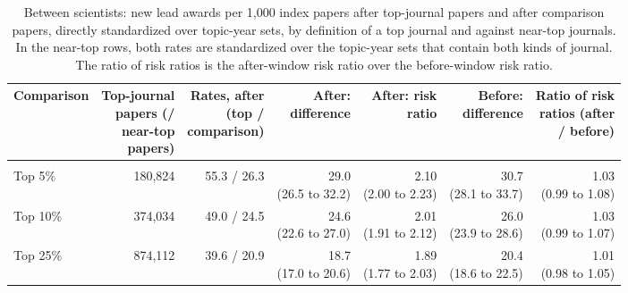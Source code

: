 \begin{table}[H]
\centering\small
\caption{Between scientists: new lead awards per 1,000 index papers after top-journal papers and after comparison papers, directly standardized over topic-year sets, by definition of a top journal and against near-top journals. In the near-top rows, both rates are standardized over the topic-year sets that contain both kinds of journal. The ratio of risk ratios is the after-window risk ratio over the before-window risk ratio.}\label{tab:s_between}
\footnotesize
\begin{tabularx}{\linewidth}{>{\raggedright\arraybackslash}Xrrrrrr}
\toprule
Comparison & \makecell[rb]{Top-journal\\papers (/\\near-top\\papers)} & \makecell[rb]{Rates, after\\(top /\\comparison)} & \makecell[rb]{After:\\difference} & \makecell[rb]{After: risk\\ratio} & \makecell[rb]{Before:\\difference} & \makecell[rb]{Ratio of risk\\ratios (after\\/ before)} \\
\midrule
\multicolumn{7}{>{\raggedright\arraybackslash}p{\dimexpr\textwidth-2\tabcolsep\relax}}{\textit{Top journals against all other journals}} \\
Top 5\% & 180,824 & 55.3 / 26.3 & \makecell[rt]{29.0\\(26.5 to 32.2)} & \makecell[rt]{2.10\\(2.00 to 2.23)} & \makecell[rt]{30.7\\(28.1 to 33.7)} & \makecell[rt]{1.03\\(0.99 to 1.08)} \\
Top 10\% & 374,034 & 49.0 / 24.5 & \makecell[rt]{24.6\\(22.6 to 27.0)} & \makecell[rt]{2.01\\(1.91 to 2.12)} & \makecell[rt]{26.0\\(23.9 to 28.6)} & \makecell[rt]{1.03\\(0.99 to 1.07)} \\
Top 25\% & 874,112 & 39.6 / 20.9 & \makecell[rt]{18.7\\(17.0 to 20.6)} & \makecell[rt]{1.89\\(1.77 to 2.03)} & \makecell[rt]{20.4\\(18.6 to 22.5)} & \makecell[rt]{1.01\\(0.98 to 1.05)} \\

\end{tabularx}
\end{table}
